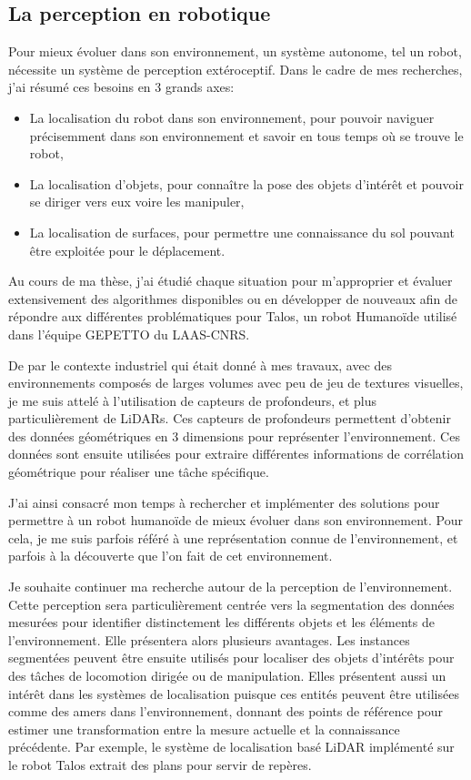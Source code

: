 \subsection{La perception en robotique}

Pour mieux évoluer dans son environnement, un système autonome, tel un robot, nécessite un système de perception extéroceptif. Dans le cadre de mes recherches, j'ai résumé ces besoins en 3 grands axes:
\begin{itemize}
  \item La localisation du robot dans son environnement, pour pouvoir naviguer précisemment dans son environnement et savoir en tous temps où se trouve le robot,
  \item La localisation d'objets, pour connaître la pose des objets d'intérêt et pouvoir se diriger vers eux voire les manipuler,
  \item La localisation de surfaces, pour permettre une connaissance du sol pouvant être exploitée pour le déplacement.
\end{itemize}

Au cours de ma thèse, j'ai étudié chaque situation pour m'approprier et évaluer extensivement des algorithmes disponibles ou en développer de nouveaux afin de répondre aux différentes problématiques pour Talos, un robot Humanoïde utilisé dans l'équipe GEPETTO du LAAS-CNRS.

De par le contexte industriel qui était donné à mes travaux, avec des environnements composés de larges volumes avec peu de jeu de textures visuelles, je me suis attelé à l'utilisation de capteurs de profondeurs, et plus particulièrement de LiDARs. Ces capteurs de profondeurs permettent d'obtenir des données géométriques en 3 dimensions pour représenter l'environnement. Ces données sont ensuite utilisées pour extraire différentes informations de corrélation géométrique pour réaliser une tâche spécifique.

J'ai ainsi consacré mon temps à rechercher et implémenter des solutions pour permettre à un robot humanoïde de mieux évoluer dans son environnement. Pour cela, je me suis parfois référé à une représentation connue de l'environnement, et parfois à la découverte que l'on fait de cet environnement.

Je souhaite continuer ma recherche autour de la perception de l'environnement. Cette perception sera particulièrement centrée vers la segmentation des données mesurées pour identifier distinctement les différents objets et les éléments de l'environnement. Elle présentera alors plusieurs avantages. Les instances segmentées peuvent être ensuite utilisés pour localiser des objets d'intérêts pour des tâches de locomotion dirigée ou de manipulation. Elles présentent aussi un intérêt dans les systèmes de localisation puisque ces entités peuvent être utilisées comme des amers dans l'environnement, donnant des points de référence pour estimer une transformation entre la mesure actuelle et la connaissance précédente. Par exemple, le système de localisation basé LiDAR implémenté sur le robot Talos extrait des plans pour servir de repères.

